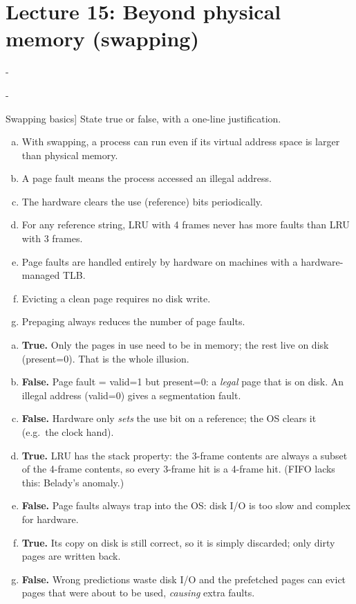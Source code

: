 \documentclass[11pt,a4paper]{article}
\makeatletter
\newcommand{\keepspace}[1]{\par\penalty-100\begingroup
  \setlength{\dimen@}{#1}\dimen@ii\pagegoal\advance\dimen@ii-\pagetotal
  \ifdim\dimen@>\dimen@ii\ifdim\dimen@ii>\z@\vfil\fi\break\fi\endgroup}
\newcounter{qn}[section]
\newcommand{\lecno}{}
\newenvironment{Qn}[2]{\refstepcounter{qn}\keepspace{8\baselineskip}%
  \begin{quizbox}[Q\lecno.\theqn\ \ [#1] #2]}{\end{quizbox}}
\newenvironment{Sol}{\begin{solbox}[Solution]}{\end{solbox}\vspace{0.4em}}
\makeatother
\begin{document}
\clearpage
\section{Lecture 15: Beyond physical memory (swapping)}
\renewcommand{\lecno}{15}

\keepspace{17\baselineskip}
\begin{Qn}{T/F}{Swapping basics}
State true or false, with a one-line justification.
\begin{enumerate}[(a)]
  \item With swapping, a process can run even if its virtual address space
        is larger than physical memory.
  \item A page fault means the process accessed an illegal address.
  \item The hardware clears the use (reference) bits periodically.
  \item For any reference string, LRU with 4 frames never has more faults
        than LRU with 3 frames.
  \item Page faults are handled entirely by hardware on machines with a
        hardware-managed TLB.
  \item Evicting a clean page requires no disk write.
  \item Prepaging always reduces the number of page faults.
\end{enumerate}
\end{Qn}
\begin{Sol}
\begin{enumerate}[(a)]
  \item \textbf{True.} Only the pages in use need to be in memory; the rest
        live on disk (present=0). That is the whole illusion.
  \item \textbf{False.} Page fault = valid=1 but present=0: a \emph{legal}
        page that is on disk. An illegal address (valid=0) gives a
        segmentation fault.
  \item \textbf{False.} Hardware only \emph{sets} the use bit on a
        reference; the OS clears it (e.g.\ the clock hand).
  \item \textbf{True.} LRU has the stack property: the 3-frame contents are
        always a subset of the 4-frame contents, so every 3-frame hit is a
        4-frame hit. (FIFO lacks this: Belady's anomaly.)
  \item \textbf{False.} Page faults always trap into the OS: disk I/O is
        too slow and complex for hardware.
  \item \textbf{True.} Its copy on disk is still correct, so it is simply
        discarded; only dirty pages are written back.
  \item \textbf{False.} Wrong predictions waste disk I/O and the prefetched
        pages can evict pages that were about to be used, \emph{causing}
        extra faults.
\end{enumerate}
\end{Sol}
\end{document}
